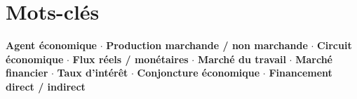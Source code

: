 \documentclass[11pt,a4paper]{article}
\begin{document}
\section*{Mots-clés}
\textcolor{mainColor}{\textbf{Agent économique}} $\cdot$
\textcolor{mainColor}{\textbf{Production marchande / non marchande}} $\cdot$
\textcolor{mainColor}{\textbf{Circuit économique}} $\cdot$
\textcolor{mainColor}{\textbf{Flux réels / monétaires}} $\cdot$
\textcolor{mainColor}{\textbf{Marché du travail}} $\cdot$
\textcolor{mainColor}{\textbf{Marché financier}} $\cdot$
\textcolor{mainColor}{\textbf{Taux d'intérêt}} $\cdot$
\textcolor{mainColor}{\textbf{Conjoncture économique}} $\cdot$
\textcolor{mainColor}{\textbf{Financement direct / indirect}}
\end{document}
